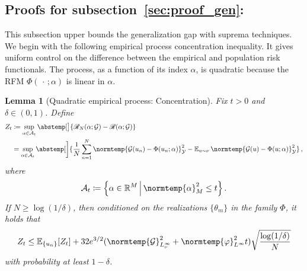 \documentclass{article}
\theoremstyle{plain}
\newtheorem{lemma}[theorem]{Lemma}
\theoremstyle{my_def}
\theoremstyle{my_rem}
\numberwithin{equation}{section}
\numberwithin{theorem}{section}%
\newcommand{\R}{\mathbb{R}}
\newcommand{\E}{\mathbb{E}}
\newcommand{\scrR}{\mathscr{R}}
\newcommand{\cA}{\mathcal{A}}
\newcommand{\cG}{\mathcal{G}}
\newcommand{\cY}{\mathcal{Y}}
\let\originalleft\left %
\let\originalright\right
\renewcommand{\left}{\mathopen{}\mathclose\bgroup\originalleft}
\renewcommand{\right}{\aftergroup\egroup\originalright}
\newcommand{\norm}{\normtemp}
\newcommand{\abs}{\abstemp}
\newcommand{\set}[2]{{\left\{ #1 \,\middle|\, #2 \right\}}}
\newcommand{\slot}{{\,\cdot\,}}
\newcommand{\defeq}{\coloneqq} %
\renewcommand{\E}{\operatorname{\mathbb{E}}} %
\newcommand{\U}{{\{u_n\}}}
\newcommand{\Th}{{\{\theta_m\}}}
\renewcommand{\phi}{\varphi}
\begin{document}
\subsection{Proofs for subsection~\ref{sec:proof_gen}:~}\label{app:proof_proof_gen}
This subsection upper bounds the generalization gap with suprema techniques. We begin with the following empirical process concentration inequality. It gives uniform control on the difference between the empirical and population risk functionals. The process, as a function of its index $\alpha$, is quadratic because the RFM $\Phi(\slot;\alpha)$ is linear in $\alpha$.
\begin{lemma}[Quadratic empirical process: Concentration]\label{lem:app_loss_sup_con}
    Fix $t>0$ and $\delta\in(0,1)$. Define
    \begin{align}
        Z_t&\defeq \sup_{\alpha\in\cA_t}\abs[\big]{\scrR_N(\alpha;\cG)-\scrR(\alpha;\cG)}\\
        &= \sup_{\alpha\in\cA_t}\abs[\bigg]{\frac{1}{N}\sum_{n=1}^N\norm{\cG(u_n)-\Phi(u_n;\alpha)}_\cY^2 - \E_{u\sim\nu}\norm{\cG(u)-\Phi(u;\alpha)}_\cY^2}\,,
    \end{align}
    where
    \begin{equation}
        \cA_t\defeq \set{\alpha\in\R^M}{\norm{\alpha}_M^2\leq t}\,.
    \end{equation}
    If $N\geq\log(1/\delta)$, then conditioned on the realizations $\Th$ in the family $\Phi$, it holds that
    \begin{equation}
        Z_t\leq \E_{\U} [Z_t] + 32e^{3/2}(\norm{\cG}_{L_\nu^\infty}^2 + \norm{\phi}_{L^\infty}^2 t)\sqrt{\frac{\log(1/\delta)}{N}}
    \end{equation}
    with probability at least $1-\delta$.
\end{lemma}
\end{document}
